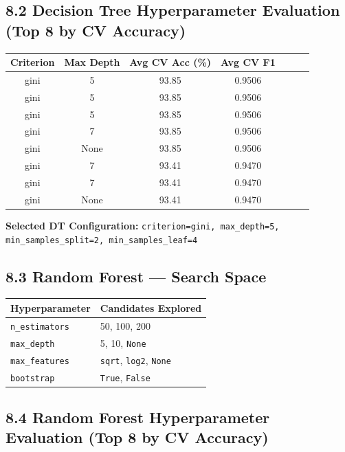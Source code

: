 \documentclass[12pt,a4paper]{article}
\begin{document}
\subsection*{8.2 Decision Tree Hyperparameter Evaluation (Top 8 by CV Accuracy)}

\begin{center}
\begin{tabular}{ccccccc}
\toprule
\textbf{Criterion} & \textbf{Max Depth} & \textbf{Avg CV Acc (\%)} & \textbf{Avg CV F1} \\
\midrule
gini      & 5    & 93.85 & 0.9506 \\
gini      & 5    & 93.85 & 0.9506 \\
gini      & 5    & 93.85 & 0.9506 \\
gini      & 7    & 93.85 & 0.9506 \\
gini      & None & 93.85 & 0.9506 \\
gini      & 7    & 93.41 & 0.9470 \\
gini      & 7    & 93.41 & 0.9470 \\
gini      & None & 93.41 & 0.9470 \\
\bottomrule
\end{tabular}
\end{center}

\textbf{Selected DT Configuration:}
\texttt{criterion=gini, max\_depth=5, min\_samples\_split=2, min\_samples\_leaf=4}

\subsection*{8.3 Random Forest — Search Space}

\begin{center}
\begin{tabular}{ll}
\toprule
\textbf{Hyperparameter}  & \textbf{Candidates Explored} \\
\midrule
\texttt{n\_estimators}   & 50, 100, 200 \\
\texttt{max\_depth}      & 5, 10, \texttt{None} \\
\texttt{max\_features}   & \texttt{sqrt}, \texttt{log2}, \texttt{None} \\
\texttt{bootstrap}       & \texttt{True}, \texttt{False} \\
\bottomrule
\end{tabular}
\end{center}

\subsection*{8.4 Random Forest Hyperparameter Evaluation (Top 8 by CV Accuracy)}
\end{document}
